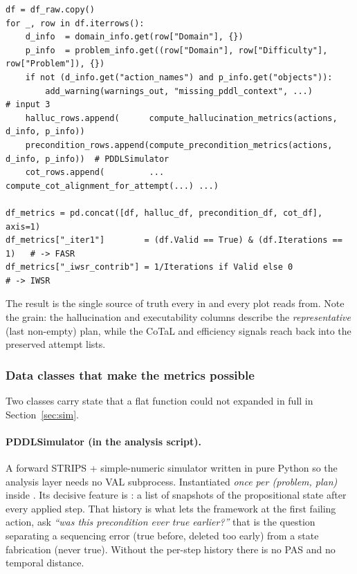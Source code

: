 \begin{lstlisting}
df = df_raw.copy()
for _, row in df.iterrows():
    d_info  = domain_info.get(row["Domain"], {})
    p_info  = problem_info.get((row["Domain"], row["Difficulty"], row["Problem"]), {})
    if not (d_info.get("action_names") and p_info.get("objects")):
        add_warning(warnings_out, "missing_pddl_context", ...)        # input 3
    halluc_rows.append(      compute_hallucination_metrics(actions, d_info, p_info))
    precondition_rows.append(compute_precondition_metrics(actions, d_info, p_info))  # PDDLSimulator
    cot_rows.append(         ... compute_cot_alignment_for_attempt(...) ...)

df_metrics = pd.concat([df, halluc_df, precondition_df, cot_df], axis=1)
df_metrics["_iter1"]        = (df.Valid == True) & (df.Iterations == 1)   # -> FASR
df_metrics["_iwsr_contrib"] = 1/Iterations if Valid else 0                # -> IWSR
\end{lstlisting}

The result  is the single source of truth every
 in  and every plot reads from. Note
the grain: the hallucination and executability columns describe the
\emph{representative} (last non-empty) plan, while the CoTaL and efficiency
signals reach back into the preserved attempt lists.

\subsubsection{Data classes that make the metrics possible}

Two classes carry state that a flat function could not  expanded in full in Section~\ref{sec:sim}.

\paragraph{PDDLSimulator (in the analysis script).} A forward STRIPS +
simple-numeric simulator written in pure Python so the analysis layer needs no
VAL subprocess. Instantiated \emph{once per (problem, plan)} inside
. Its decisive feature is : a
list of  snapshots of the propositional state after every
applied step. That history is what lets the framework at the first failing
action, ask \emph{``was this precondition ever true earlier?''} that is the question
separating a sequencing error (true before, deleted too early) from a state
fabrication (never true). Without the per-step history there is no PAS and no
temporal distance.

